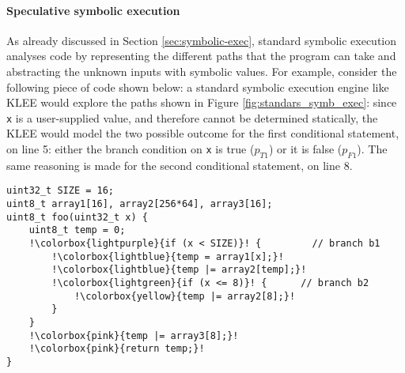 \documentclass[target=mst,aauheader=aics]{thud}
\theoremstyle{definition}
\begin{document}
	\paragraph{Speculative symbolic execution} As already discussed in Section \ref{sec:symbolic-exec}, standard symbolic execution analyses code by representing the different paths that the program can take and abstracting the unknown inputs with symbolic values. For example, consider the following piece of code shown below: a standard symbolic execution engine like KLEE would explore the paths shown in Figure \ref{fig:standars_symb_exec}: since \texttt{x} is a user-supplied value, and therefore cannot be determined statically, the KLEE would model the two possible outcome for the first conditional statement, on line 5: either the branch condition on \texttt{x} is true ($p_{T1}$) or it is false ($p_{F1}$). The same reasoning is made for the second conditional statement, on line 8.
	\begin{minipage}{.7\textwidth}
	\begin{lstlisting}[escapechar=!]
uint32_t SIZE = 16; 
uint8_t array1[16], array2[256*64], array3[16];
uint8_t foo(uint32_t x) { 
	uint8_t temp = 0; 
	!\colorbox{lightpurple}{if (x < SIZE)}! {		  // branch b1
		!\colorbox{lightblue}{temp = array1[x];}!
		!\colorbox{lightblue}{temp |= array2[temp];}!
		!\colorbox{lightgreen}{if (x <= 8)}! {		// branch b2
			!\colorbox{yellow}{temp |= array2[8];}!
		}	
	}
	!\colorbox{pink}{temp |= array3[8];}!
	!\colorbox{pink}{return temp;}!
}
	\end{lstlisting}
    \end{minipage}
    
\end{document}
